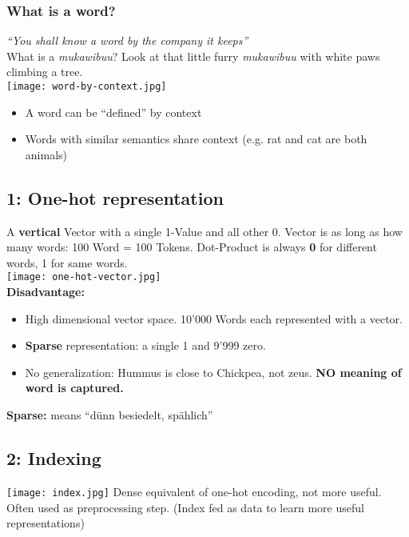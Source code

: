 \subsubsection{What is a word?}
\textit{``You shall know a word by the company it keeps''}\\
What is a \textit{mukawibuu}?
Look at that little furry \textit{mukawibuu} with white paws climbing a tree.\\
\texttt{[image: word-by-context.jpg]}
\begin{itemize}
    \item A word can be ``defined'' by context
    \item Words with similar semantics share context (e.g. rat and cat are both animals)
\end{itemize}


\subsection{1: One-hot representation}
A \textbf{vertical} Vector with a single 1-Value and all other 0.
Vector is as long as how many words: 100 Word = 100 Tokens.
Dot-Product is always \textbf{0} for different words, 1 for same words.\\
\texttt{[image: one-hot-vector.jpg]}\\
\textbf{Disadvantage:}
\begin{itemize}
    \item High dimensional vector space. 10'000 Words each represented with a vector.
    \item \textbf{Sparse} representation: a single 1 and 9'999 zero.
    \item No generalization: Hummus is close to Chickpea, not zeus. \textbf{NO meaning of word is captured.}
\end{itemize}
\textbf{Sparse:} means ``dünn besiedelt, spählich''

\subsection{2: Indexing}
\texttt{[image: index.jpg]}
Dense equivalent of one-hot encoding, not more useful.
Often used as preprocessing step. (Index fed as data to learn more useful representations)

